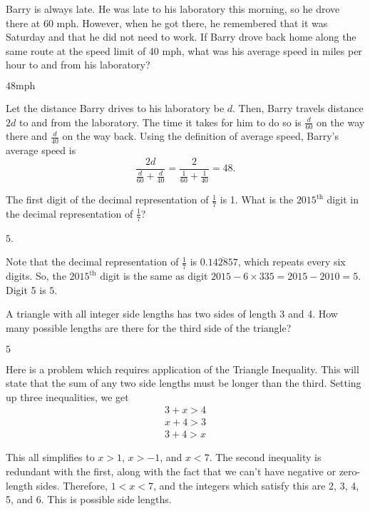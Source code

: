 \documentclass[11pt]{article}
\begin{document}
\begin{problem}
Barry is always late. He was late to his laboratory this morning, so he drove there at 60 mph. However, when he got there, he remembered that it was Saturday and that he did not need to work. If Barry drove back home along the same route at the speed limit of 40 mph, what was his average speed in miles per hour to and from his laboratory?
\end{problem}
\begin{answer}
$\boxed{48} \text{mph}$
\end{answer}
\begin{solution}
Let the distance Barry drives to his laboratory be $d$. Then, Barry travels distance $2d$ to and from the laboratory. The time it takes for him to do so is $\frac{d}{60}$ on the way there and $\frac{d}{40}$ on the way back. Using the definition of average speed, Barry's average speed is
\[
\frac{2d}{\frac{d}{60} + \frac{d}{40}} = \frac{2}{\frac{1}{60} + \frac{1}{40}} = \boxed{48}.
\]
\end{solution}

\begin{problem}
The first digit of the decimal representation of $\frac{1}{7}$ is 1. What is the $2015^{\text{th}}$ digit in the decimal representation of $\frac{1}{7}$?
\end{problem}
\begin{answer}
$\boxed{5}$.
\end{answer}
\begin{solution}
Note that the decimal representation of $\frac{1}{7}$ is $0.\overline{142857}$,  which repeats every six digits. So, the $2015^{\text{th}}$ digit is the same as digit $2015 - 6 \times 335 = 2015 - 2010 = 5$. Digit 5 is $\boxed{5}$.
\end{solution}

\begin{problem} %
A triangle with all integer side lengths has two sides of length 3 and 4. How many possible lengths are there for the third side of the triangle?
\end{problem}
\begin{answer}
$\boxed{5}$
\end{answer}
\begin{solution}Here is a problem which requires application of the Triangle Inequality. This will state that the sum of any two side lengths must be longer than the third. Setting up three inequalities, we get
\begin{align*}
3+x>4\\
x+4>3\\
3+4>x
\end{align*}

This all simplifies to $x>1$, $x>-1$, and $x<7$. The second inequality is redundant with the first, along with the fact that we can't have negative or zero-length sides. Therefore, $1<x<7$, and the integers which satisfy this are 2, 3, 4, 5, and 6. This is  possible side lengths.
\end{solution}
\end{document}
